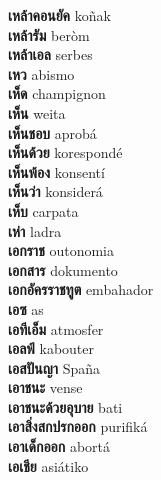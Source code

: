 \textbf{ เหล้าคอนยัค  } koñak \\
\textbf{ เหล้ารัม  } beròm \\
\textbf{ เหล้าเอล  } serbes \\
\textbf{ เหว  } abismo \\
\textbf{ เห็ด  } champignon \\
\textbf{ เห็น  } weita \\
\textbf{ เห็นชอบ  } aprobá \\
\textbf{ เห็นด้วย  } korespondé \\
\textbf{ เห็นพ้อง  } konsentí \\
\textbf{ เห็นว่า  } konsiderá \\
\textbf{ เห็บ  } carpata \\
\textbf{ เห่า  } ladra \\
\textbf{ เอกราช  } outonomia \\
\textbf{ เอกสาร  } dokumento \\
\textbf{ เอกอัครราชทูต  } embahador \\
\textbf{ เอซ  } as \\
\textbf{ เอทีเอ็ม  } atmosfer \\
\textbf{ เอลฟ์  } kabouter \\
\textbf{ เอสปันญา  } Spaña \\
\textbf{ เอาชนะ  } vense \\
\textbf{ เอาชนะด้วยอุบาย  } bati \\
\textbf{ เอาสิ่งสกปรกออก  } purifiká \\
\textbf{ เอาเด็กออก  } abortá \\
\textbf{ เอเชีย  } asiátiko \\
